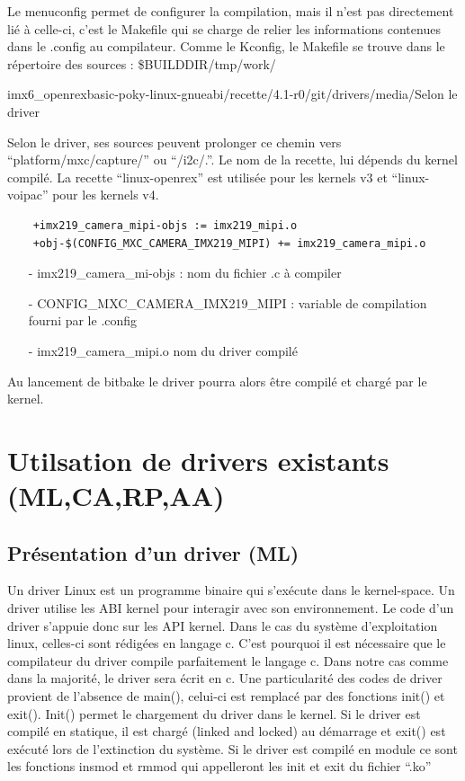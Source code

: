 Le menuconfig permet de configurer la compilation, mais il n’est pas directement lié à
celle-ci, c’est le Makefile qui se charge de relier les informations contenues dans le .config
au compilateur. Comme le Kconfig, le Makefile se trouve dans le répertoire des sources :
\$BUILDDIR/tmp/work/{imx6\_openrexbasic-poky-linux-gnueabi/{recette}/4.1-r0/git/drivers/media/{Selon le driver}

Selon le driver, ses sources peuvent prolonger ce chemin vers “platform/mxc/capture/” ou
“/i2c/.”. Le nom de la recette, lui dépends du kernel compilé. La recette “linux-openrex” est
utilisée pour les kernels v3 et “linux-voipac” pour les kernels v4.

\begin{lstlisting}
    +imx219_camera_mipi-objs := imx219_mipi.o
    +obj-$(CONFIG_MXC_CAMERA_IMX219_MIPI) += imx219_camera_mipi.o
\end{lstlisting}

\begin{itemize}
    \item[-] imx219\_camera\_mi-objs : nom du fichier .c à compiler
    \item[-] CONFIG\_MXC\_CAMERA\_IMX219\_MIPI : variable de compilation fourni par le .config
    \item[-] imx219\_camera\_mipi.o nom du driver compilé
\end{itemize}

Au lancement de bitbake le driver pourra alors être compilé et chargé par le kernel.

\section{Utilsation de drivers existants (ML,CA,RP,AA)}

\subsection{Présentation d'un driver (ML)}

Un driver Linux est un programme binaire qui s’exécute dans le kernel-space. Un driver
utilise les ABI kernel pour interagir avec son environnement. Le code d’un driver s’appuie
donc sur les API kernel. Dans le cas du système d’exploitation linux, celles-ci sont
rédigées en langage c. C’est pourquoi il est nécessaire que le compilateur du driver
compile parfaitement le langage c. Dans notre cas comme dans la majorité, le driver sera
écrit en c. Une particularité des codes de driver provient de l’absence de main(), celui-ci
est remplacé par des fonctions init() et exit(). Init() permet le chargement du driver dans le
kernel. Si le driver est compilé en statique, il est chargé (linked and locked) au démarrage
et exit() est exécuté lors de l’extinction du système. Si le driver est compilé en module ce
sont les fonctions insmod et rmmod qui appelleront les init et exit du fichier “.ko”

}
